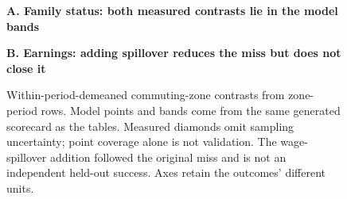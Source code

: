 \begin{figure}[t]
\centering
\scorelegend\par\medskip
\textbf{A. Family status: both measured contrasts lie in the model bands}\par\smallskip

\par\bigskip
\textbf{B. Earnings: adding spillover reduces the miss but does not close it}\par\smallskip

\caption{Within-period-demeaned commuting-zone contrasts from
\PanelCount{} zone-period rows. Model points and bands come from the same
generated scorecard as the tables. Measured diamonds omit sampling uncertainty;
point coverage alone is not validation. The wage-spillover addition followed
the original miss and is not an independent held-out success. Axes retain the
outcomes' different units.}
\label{fig:panel-checks}
\end{figure}
